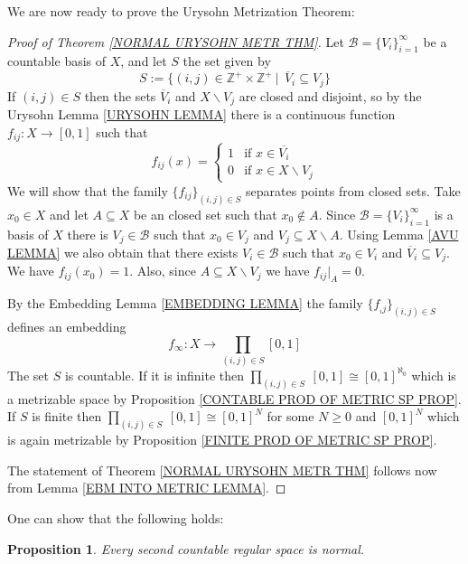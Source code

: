 \documentclass[11pt, letterpaper, oneside]{report}
\theoremstyle{pplain}
\newtheorem{proposition}[theorem]{Proposition}
\newtheorem{ITERMVALUE THM}[theorem]{Intermediate Value Theorem}
\newtheorem{HEINEBOREL THM}[theorem]{Heine-Borel Theorem}
\newtheorem{UMETR THM}[theorem]{Urysohn Metrization Theorem}
\newtheorem{UMETR2 THM}[theorem]{Urysohn Metrization Theorem (v.2)}
\theoremstyle{ddefinition}
\theoremstyle{nnn}
\newtheorem{TDA NN}[theorem]{Topological Data Analysis. }
\theoremstyle{eexercise}
\newcommand{\Z}{{\mathbb Z}}
\newcommand{\BB}{{\mathcal B}}
\newcommand{\ssmin}{\smallsetminus}
\begin{document}
We are now ready to prove the Urysohn Metrization Theorem:

\begin{proof}[Proof of Theorem \ref{NORMAL URYSOHN METR THM}]
Let $\BB= \{V_{i}\}_{i=1}^{\infty}$ be a countable basis of $X$, and let $S$ the set given by 
$$S := \{(i, j)\in \Z^{+}\times \Z^{+} \ | \ \ \overline{V}_{i} \subseteq V_{j} \}$$
 If $(i, j) \in S$ then the sets $\overline{V}_{i}$ and $X\ssmin V_{j}$ are closed and disjoint, 
so by the Urysohn Lemma  \ref{URYSOHN LEMMA} there is a continuous function 
$f_{ij} \colon X\to [0, 1]$ such that 
$$
f_{ij}(x) = 
\begin{cases}
1  & \text{if $x\in \overline{V_{i}}$} \\
0  & \text{if $x\in X\ssmin V_{j}$} 
\end{cases}
$$
We will show that the family $\{f_{ij}\}_{(i, j)\in S}$ separates points from closed sets. 
Take $x_{0}\in X$ and let $A\subseteq X$ be an closed  set
such that $x_{0}\not\in A$. 
Since $\BB= \{V_{i}\}_{i=1}^{\infty}$ is a basis of $X$ there is $V_{j}\in \BB$ such that 
$x_{0}\in V_{j}$ and $V_{j} \subseteq X\ssmin A$. 
Using Lemma \ref{AVU LEMMA} we also obtain that there exists 
$V_{i}\in \BB$ such that $x_{0}\in V_{i}$ and $\overline{V}_{i} \subseteq V_{j}$. We have 
$f_{ij}(x_{0}) =1$. Also, since $A\subseteq X\ssmin V_{j}$ we have $f_{ij}|_{A} = 0$. 

By the Embedding Lemma \ref{EMBEDDING LEMMA} the family $\{f_{_ij}\}_{(i, j)\in S}$  defines an  embedding 
$$f_{\infty} \colon X \to \prod_{(i, j)\in S} [0, 1]$$
The set $S$ is countable. If it is infinite then $\prod_{(i, j)\in S}\  [0, 1] \cong [0, 1]^{\aleph_{0}}$ which is a metrizable space
by Proposition \ref{CONTABLE PROD OF METRIC SP PROP}. 
If $S$ is finite then $\prod_{(i, j)\in S}\  [0, 1] \cong [0, 1]^{N}$ for some $N \geq 0$ and $ [0, 1]^{N}$
which is again metrizable by Proposition \ref{FINITE PROD OF METRIC SP PROP}. 

The statement of Theorem  \ref{NORMAL URYSOHN METR THM} follows now from  
Lemma \ref{EBM INTO METRIC LEMMA}.
\end{proof}



One can show that the following holds: 

\begin{proposition}
\label{REG COUNT BASIS IS NORMAL PROP}
Every second countable regular space is normal. 
\end{proposition}
\end{document}
